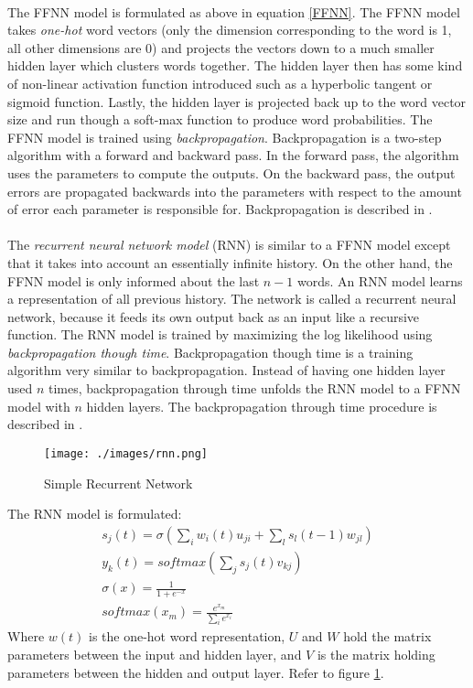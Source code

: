 \documentclass[12pt]{ociamthesis}
\begin{document}
\paragraph{}
The FFNN model is formulated as above in equation \ref{FFNN}. The FFNN model takes \emph{one-hot} word vectors (only the dimension corresponding to the word is 1, all other dimensions are 0) and projects the vectors down to a much smaller hidden layer which clusters words together. The hidden layer then has some kind of non-linear activation function introduced such as a hyperbolic tangent or sigmoid function. Lastly, the hidden layer is projected back up to the word vector size and run though a soft-max function to produce word probabilities. The FFNN model is trained using \emph{backpropagation}. Backpropagation is a two-step algorithm with a forward and backward pass. In the forward pass, the algorithm uses the parameters to compute the outputs. On the backward pass, the output errors are propagated backwards into the parameters with respect to the amount of error each parameter is responsible for. Backpropagation is described in \cite{Bengio2003}.

\paragraph{}
The \emph{recurrent neural network model} (RNN) is similar to a FFNN model except that it takes into account an essentially infinite history. On the other hand, the FFNN model is only informed about the last $n-1$ words. An RNN model learns a representation of all previous history. The network is called a recurrent neural network, because it feeds its own output back as an input like a recursive function. The RNN model is trained by maximizing the log likelihood using \emph{backpropagation though time}. Backpropagation though time is a training algorithm very similar to backpropagation. Instead of having one hidden layer used $n$ times, backpropagation through time unfolds the RNN model to a FFNN model with $n$ hidden layers. The backpropagation through time procedure is described in \cite{Mikolav2012}.

\begin{figure}
\centering
\texttt{[image: ./images/rnn.png]}
\caption{Simple Recurrent Network \cite[pg. 34]{Mikolav2012}}
\label{fig:RNNfigure}
\end{figure}

The RNN model is formulated:
\begin{align}
s_j(t) = \sigma \left( \sum_i w_i(t) u_{ji} + \sum_l s_l (t-1) w_{jl} \right)
\\y_k(t) = softmax \left( \sum_j s_j(t) v_{kj} \right)
\\ \sigma(x) = \frac{1}{1+e^{-x}}
\\ softmax(x_m) = \frac{e^{x_m} }{ \sum_i e^{x_i} } 
\end{align}
Where $w(t)$ is the one-hot word representation, $U$ and $W$ hold the matrix parameters between the input and hidden layer, and $V$ is the matrix holding parameters between the hidden and output layer. Refer to figure \ref{fig:RNNfigure}.
\end{document}
